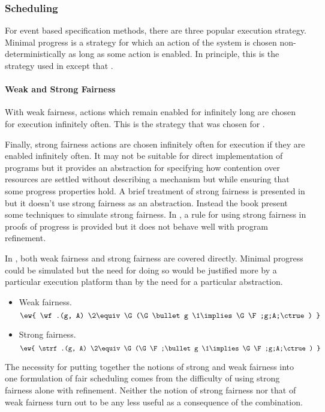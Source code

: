 \subsubsection{Scheduling}
For event based specification methods, there are three popular execution strategy. Minimal progress is a strategy for which an action of the system is chosen non-deterministically as long as some action is enabled. In principle, this is the strategy used in \eventB except that .

\paragraph{Weak and Strong Fairness}
With weak fairness, actions which remain enabled for infinitely long are chosen for execution infinitely often.  This is the strategy that was chosen for \unity.

Finally, strong fairness 
actions are chosen infinitely often for execution if they are enabled infinitely often.  It may not be suitable for direct implementation of programs but it provides an abstraction for specifying how contention over resources are settled without describing a mechanism but while ensuring that some progress properties hold. A brief treatment of strong fairness is presented in \cite[sect.\ 6.5.7]{DBLP:journals/csur/Misra96} but it doesn't use strong fairness as an abstraction.  Instead the book present some techniques to simulate strong fairness.  In \cite{DBLP:journals/fac/JutlaR97}, a rule for using strong fairness in proofs of progress is provided but it does not behave well with program refinement.

In \unitb, both weak fairness and strong fairness are covered directly. Minimal progress could be simulated but the need for doing so would be justified more by a particular execution platform than by the need for a particular abstraction.
%
\begin{itemize}
\item Weak fairness.
	\begin{equation}
		\ew{ \wf.(g, A)  \2\equiv  \G (\G \bullet g \1\implies \G \F;g;A;\ctrue) }
	\end{equation}
\item Strong fairness.
	\begin{equation}
		\ew{ \strf.(g, A)  \2\equiv  \G (\G \F;\bullet g \1\implies \G \F;g;A;\ctrue) }
	\end{equation}
\end{itemize}
%
The necessity for putting together the notions of strong and weak fairness into one formulation of fair scheduling comes from the difficulty of using strong fairness alone with refinement.  Neither the notion of strong fairness nor that of weak fairness turn out to be any less useful as a consequence of the combination.

